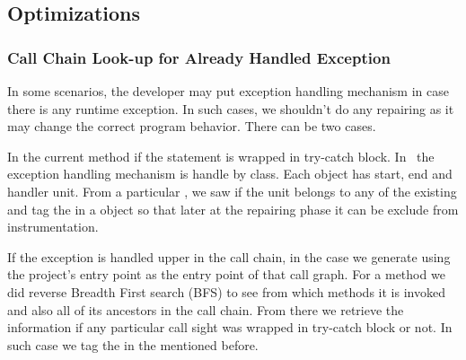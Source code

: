 \subsection{Optimizations}
\label{subsec:optimizations}

\subsubsection{Call Chain Look-up for Already Handled Exception}
\label{subsubsec:callChainLookUp}

In some scenarios, the developer may put exception handling mechanism in case
there is any runtime exception. In such cases, we shouldn't do any repairing
as it may change the correct program behavior. There can be two cases.

\begin{mylist}

\item In the current method if the statement is wrapped in try-catch block. In
\soot\
the exception handling mechanism is handle by  class. Each
object has start, end and handler unit. From a particular , we saw if
the unit belongs to any of the existing \code{Trap} and tag the \code{Unit} in
a \code{HashMap} object so that later at the repairing phase it can be exclude
from instrumentation.

\item If the exception is handled upper in the call chain, in the case we
generate
 using the project's entry point as the entry point of that call
graph. For a method we did reverse Breadth First search (BFS) to see from which
methods it is invoked and also all of its ancestors in the call chain. From
there
we retrieve the information if any particular call sight was wrapped in
try-catch
block or not. In such case we tag the  in the 
mentioned
before.

\end{mylist}

